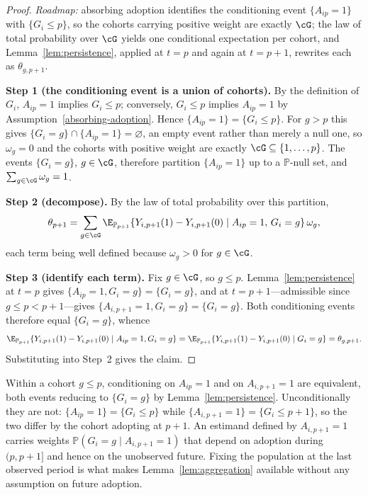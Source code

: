 \documentclass{article}
\renewcommand{\P}{\mathbb{P}}
\begin{document}
\begin{proof}
\textit{Roadmap:} absorbing adoption identifies the conditioning event $\{A_{ip}=1\}$ with $\{G_i \leq p\}$, so the cohorts carrying positive weight are exactly $\cG$; the law of total probability over $\cG$ yields one conditional expectation per cohort, and Lemma~\ref{lem:persistence}, applied at $t=p$ and again at $t=p+1$, rewrites each as $\theta_{g,p+1}$.

\textbf{Step 1 (the conditioning event is a union of cohorts).} By the definition of $G_i$, $A_{ip}=1$ implies $G_i \leq p$; conversely, $G_i \leq p$ implies $A_{ip}=1$ by Assumption~\ref{absorbing-adoption}. Hence $\{A_{ip}=1\} = \{G_i \leq p\}$. For $g > p$ this gives $\{G_i = g\} \cap \{A_{ip}=1\} = \varnothing$, an empty event rather than merely a null one, so $\omega_g = 0$ and the cohorts with positive weight are exactly $\cG \subseteq \{1,\ldots,p\}$. The events $\{G_i = g\}$, $g \in \cG$, therefore partition $\{A_{ip}=1\}$ up to a $\P$-null set, and $\sum_{g\in\cG}\omega_g = 1$.

\textbf{Step 2 (decompose).} By the law of total probability over this partition,
\[
\theta_{p+1} = \sum_{g \in \cG} \E_{\P_{p+1}}\{Y_{i,p+1}(1) - Y_{i,p+1}(0) \mid A_{ip}=1,\, G_i = g\}\,\omega_g,
\]
each term being well defined because $\omega_g > 0$ for $g \in \cG$.

\textbf{Step 3 (identify each term).} Fix $g \in \cG$, so $g \leq p$. Lemma~\ref{lem:persistence} at $t = p$ gives $\{A_{ip}=1, G_i=g\} = \{G_i=g\}$, and at $t = p+1$---admissible since $g \leq p < p+1$---gives $\{A_{i,p+1}=1, G_i=g\} = \{G_i=g\}$. Both conditioning events therefore equal $\{G_i=g\}$, whence
\[
\E_{\P_{p+1}}\{Y_{i,p+1}(1) - Y_{i,p+1}(0) \mid A_{ip}=1, G_i = g\}
= \E_{\P_{p+1}}\{Y_{i,p+1}(1) - Y_{i,p+1}(0) \mid G_i = g\}
= \theta_{g,p+1}.
\]
Substituting into Step~2 gives the claim.
\end{proof}

\begin{remark}\label{rem:aggregation-scope}
Within a cohort $g \leq p$, conditioning on $A_{ip}=1$ and on $A_{i,p+1}=1$ are equivalent, both events reducing to $\{G_i=g\}$ by Lemma~\ref{lem:persistence}. Unconditionally they are not: $\{A_{ip}=1\} = \{G_i \leq p\}$ while $\{A_{i,p+1}=1\} = \{G_i \leq p+1\}$, so the two differ by the cohort adopting at $p+1$. An estimand defined by $A_{i,p+1}=1$ carries weights $\P(G_i = g \mid A_{i,p+1}=1)$ that depend on adoption during $(p,p+1]$ and hence on the unobserved future. Fixing the population at the last observed period is what makes Lemma~\ref{lem:aggregation} available without any assumption on future adoption.
\end{remark}
\end{document}
